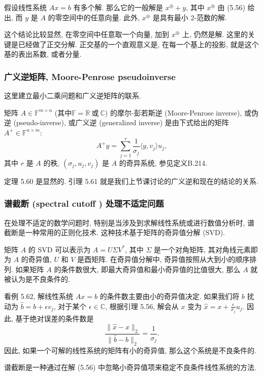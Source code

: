\documentclass[a4paper]{ctexart}
\newcommand{\hl}[1]
{\noindent {\bf {#1}}}
\begin{document}
{\hl{定理5.58} 
假设线性系统 $Ax = b$ 有多个解. 那么它的一般解是 $x^{\oplus} + y$, 
其中 $x^{\oplus}$ 由 (5.56) 给出, 而 $y$ 是 $A$ 的零空间中的任意向量. 此外, $x^{\oplus}$ 是具有最小 $2$-范数的解.

这个结论比较显然, 在零空间中任意取一个向量, 加到 $x^{\oplus}$ 上, 仍然是解. 这里的关键是已经做了正交分解. 
正交基的一个直观意义是, 在每一个基上的投影, 就是这个基的表出系数, 或者分量. 

\subsubsection{广义逆矩阵, Moore-Penrose pseudoinverse}

这里建立最小二乘问题和广义逆矩阵的联系. 

\hl{定义5.59} 矩阵 $A \in \mathbb{F}^{m \times n}$ 
(其中$\mathbb{F} = \mathbb{R}~\mbox{或}~\mathbb{C}$) 的摩尔-彭若斯逆 (Moore-Penrose inverse),
或伪逆 (pseudo-inverse), 或广义逆 (generalized inverse) 是由下式给出的矩阵
$A^+ \in \mathbb{F}^{n \times m}$:
\[ 
A^+ y = \sum_{j=1}^{r} \frac{1}{\sigma_j} \langle y, v_j \rangle u_j, 
\]
其中 $r$ 是 $A$ 的秩, $(\sigma_j, u_j, v_j)$ 是 $A$ 的奇异系统, 参见定义B.214. 

定理 5.60 是显然的. 引理 5.61 就是我们上节课讨论的广义逆和现在的结论的关系. 

\subsubsection{谱截断 (spectral cutoff ) 处理不适定问题}

在处理不适定的数学问题时, 特别是当涉及到求解线性系统或进行数值分析时, 
谱截断是一种常用的正则化技术. 这种技术基于矩阵的奇异值分解 (SVD).

矩阵 $A$ 的 SVD 可以表示为 $A = U\Sigma V^*$, 其中 $\Sigma$ 是一个对角矩阵, 
其对角线元素即为 $A$ 的奇异值, $U$ 和 $V$ 是酉矩阵. 在奇异值分解中, 
奇异值按照从大到小的顺序排列. 如果矩阵 $A$ 的条件数很大, 即最大奇异值和最小奇异值的比值很大, 
那么 $A$ 就被认为是不良条件的.

看例 5.62, 解线性系统 $Ax = b$ 的条件数主要由小的奇异值决定. 
如果我们将 $b$ 扰动为 $\hat{b} = b + \epsilon v_j$, 对于某个 
$\epsilon \in \mathbb{C}$, 根据引理 5.56, 解会从 $x$ 变为 
$\hat{x} = x + \frac{\epsilon}{\sigma_j} u_j$. 
因此, 基于绝对误差的条件数是
\[ 
\frac{\|\hat{x} - x\|_2}{\|\hat{b} - b\|_2} = \frac{1}{\sigma_j}. 
\]
因此, 如果一个可解的线性系统的矩阵有小的奇异值, 那么这个系统是不良条件的. 

\hl{定义5.63} 谱截断是一种通过在解 (5.56) 中忽略小奇异值项来稳定不良条件线性系统的方法. 

}
\end{document}
